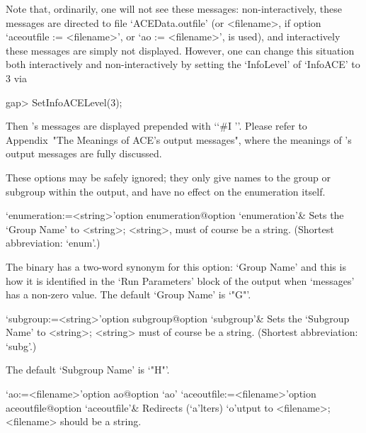 Note   that,  ordinarily,  one   will   not   see   these    messages:
non-interactively,   these   messages    are    directed    to    file
`ACEData.outfile'   (or   <filename>,   if   option   `aceoutfile   :=
<filename>', or `ao := <filename>', is used), and interactively  these
messages are simply  not  displayed.  However,  one  can  change  this
situation both interactively and   non-interactively  by  setting  the
`InfoLevel' of `InfoACE' to 3 via

\begintt
gap> SetInfoACELevel(3);
\endtt

Then {\ACE}'s messages are  displayed  prepended  with  \lq{}`\#I  ''.
Please refer to Appendix~"The  Meanings  of  ACE's  output  messages",
where the meanings of {\ACE}'s output messages are fully discussed.

\enditems


These options may be safely ignored; they only give names to the group
or subgroup within the {\ACE}  output,  and  have  no  effect  on  the
enumeration itself.

\beginitems

\>`enumeration:=<string>'{option enumeration}@{option `enumeration'}&
Sets the `Group Name' to <string>;  <string>,  must  of  course  be  a
string. (Shortest abbreviation: `enum'.)

The {\ACE} binary has a two-word synonym for this option: `Group Name'
and this is how it is identified in the \lq{}Run Parameters' block  of
the {\ACE} output when `messages' has a non-zero  value.  The  default
`Group Name' is `"G"'.

\>`subgroup:=<string>'{option subgroup}@{option `subgroup'}& 
Sets the `Subgroup Name' to <string>; <string> must  of  course  be  a
string. (Shortest abbreviation: `subg'.)

The default `Subgroup Name' is `"H"'.

\enditems


\beginitems

\>`ao:=<filename>'{option ao}@{option `ao'}
\>`aceoutfile:=<filename>'{option aceoutfile}@{option `aceoutfile'}&
Redirects (`a'lters) `o'utput to <filename>; <filename>  should  be  a
string.

